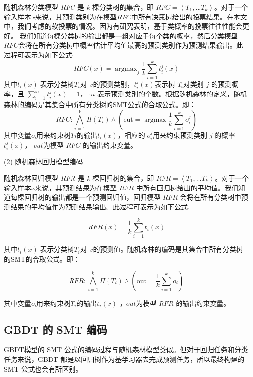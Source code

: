 随机森林分类模型 $RFC$ 是 $k$ 棵分类树的集合，即 $RFC=\left\langle T_{1}, \ldots T_{k}\right\rangle$。对于一个输入样本$x$来说，其预测类别为在模型$RFC$中所有决策树给出的投票结果。在本文中，我们考虑的软投票的情况。因为有研究表明，基于类概率的投票往往性能会更好。
我们知道每棵分类树的输出都是一组对应于每个类的概率，然后分类模型 $RFC$会将在所有分类树中概率估计平均值最高的预测类别作为预测结果输出。此过程可表示为如下公式:
\begin{equation}\label{eq:1}
RFC(x)=\operatorname{argmax}_{j} \frac{1}{k} \sum_{i=1}^{k} t_{i}^{j}(x)
\end{equation}
其中$t_i(x)$ 表示分类树$T_i$对 $x$的预测类别，$t_{i}^{j}(x)$表示树 $T_i$对类别 $j$ 的预测概率，且 $\sum_{i=1}^{m} t_{i}^{j}(x)=1$， $m$ 表示预测类别的个数。根据随机森林的定义，随机森林的编码是其集合中所有分类树的SMT公式的合取公式。即：
\begin{equation}\label{eq:2}
 RFC: \bigwedge_{i=1}^{k} \Pi\left(T_{i}\right) \wedge\left(\text {out}=\operatorname{argmax} \frac{1}{k} \sum_{i=1}^{k} o_{i}^{j}\right)
\end{equation}
其中变量$o_i$用来约束树$Ti$的输出$t_i(x)$，相应的 $o_{i}^{j}$用来约束预测类别 $j$ 的概率$t_{i}^{j}(x)$， $out$为模型 $RFC$ 的输出约束变量。

(2) 随机森林回归模型编码

随机森林回归模型 $RFR$ 是 $k$ 棵回归树的集合，即 $RFR=\left\langle T_{1}, \ldots T_{k}\right\rangle$。对于一个输入样本$x$来说，其预测结果为在模型 $RFR$ 中所有回归树给出的平均值。我们知道每棵回归树的输出都是一个预测回归值，回归模型 $RFR$ 会将在所有分类树中预测结果的平均值作为预测结果输出。此过程可表示为如下公式:

\begin{equation}\label{eq:3}
RFR(x)=\frac{1}{k} \sum_{i=1}^{k} t_{i}(x)
\end{equation}

其中$t_i(x)$ 表示分类树$T_i$对 $x$的预测值。随机森林的编码是其集合中所有分类树的SMT的合取公式。即：

\begin{equation}\label{eq:4}
RFR:\bigwedge_{i=1}^{k} \Pi\left(T_{i}\right) \wedge\left(\text {out}= \frac{1}{k} \sum_{i=1}^{k} o_{i}\right)
\end{equation}

其中变量$o_i$用来约束树$T_i$的输出$t_i(x)$ ，$out$为模型 $RFR$ 的输出约束变量。

\subsection{GBDT 的 SMT 编码}
GBDT模型的 SMT 公式的编码过程与随机森林模型类似。但对于回归任务和分类任务来说，GBDT 都是以回归树作为基学习器去完成预测任务，所以最终构建的 SMT 公式也会有所区别。


